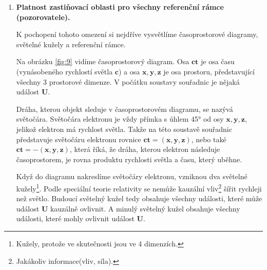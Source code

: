 \begin{enumerate}
    \item \textbf{Platnost zastiňovací oblasti pro všechny referenční rámce (pozorovatele).}

    K pochopení tohoto omezení si nejdříve vysvětlíme časoprostorové diagramy, světelné kužely a referenční rámce.

    Na obrázku \ref{fig:9} vidíme časoprostorový diagram. Osa $\bm{ct}$ je osa času (vynásobeného rychlostí světla $\bm{c}$) a osa $\bm{x,y,z}$ je osa prostoru, představující všechny 3 prostorové dimenze. V počátku soustavy souřadnic je nějaká událost $\bm{U}$. 
    
    Dráha, kterou objekt sleduje v časoprostorovém diagramu, se nazývá světočára. Světočára elektronu je vždy přímka s úhlem 45° od osy $\bm{x,y,z}$, jelikož elektron má rychlost světla. Takže na této soustavě souřadnic představuje světočáru elektronu rovnice $\bm{ct=(x,y,z)}$, nebo také $\bm{ct=-(x,y,z)}$, která říká, že dráha, kterou elektron následuje časoprostorem, je rovna produktu rychlosti světla a času, který uběhne.

    Když do diagramu nakreslíme světočáry elektronu, vzniknou dva světelné kužely\footnote[7]{Kužely, protože ve skutečnosti jsou ve 4 dimenzích.}. Podle speciální teorie relativity\parencite{SpRel} se nemůže kauzální vliv\footnote[8]{Jakákoliv informace(vliv, síla).} šířit rychleji než světlo. Budoucí světelný kužel tedy obsahuje všechny události, které může událost $\bm{U}$ kauzálně ovlivnit. A minulý světelný kužel obsahuje všechny události, které mohly ovlivnit událost $\bm{U}$.

    \clearpage

    \begin{figure}[ht]

        \centering
    
\end{figure}
\end{enumerate}
